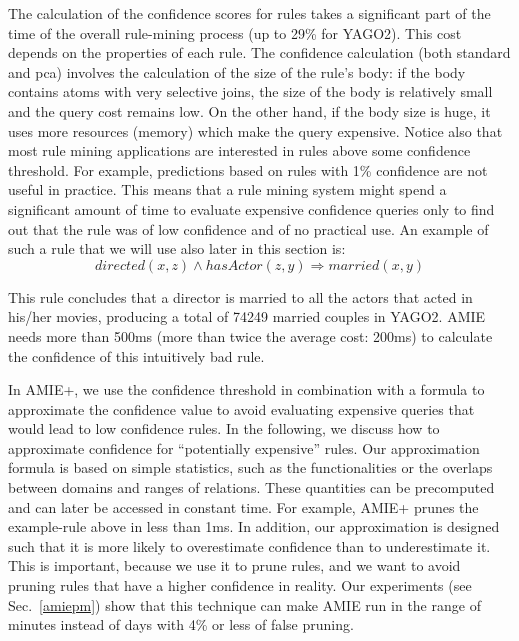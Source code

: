 The calculation of the confidence scores for rules takes a significant part of the time 
of the overall rule-mining process (up to 29\% for YAGO2). 
This cost depends on the properties of each rule. The confidence calculation (both standard and pca) involves the calculation of the 
size of the rule's body: if the body contains atoms with very selective joins, the size of the body is relatively small and the query cost remains low. 
On the other hand, if the body size is huge, it uses more resources (memory) which make the query expensive.
Notice also that most rule mining applications are interested in rules above some confidence threshold.
For example, predictions based on rules with 1\% confidence are not useful in practice.
This means that  a rule mining system might spend a significant amount of time to evaluate expensive confidence queries only to find out that
the rule was of low confidence and of no practical use.
An example of such a rule that we will use also later in this section is:
\[
  directed(x,z) \wedge hasActor(z,y) \Rightarrow married(x,y)
\]


This rule concludes that a director is married to all the actors that acted in his/her movies, producing a total of 74249 married couples in YAGO2.
AMIE needs more than 500ms (more than twice the average cost: 200ms) to calculate the confidence of this intuitively bad rule.

In AMIE+, we use the confidence threshold in combination with a formula to approximate the confidence value 
to avoid evaluating expensive queries that would lead to low confidence rules.
In the following, we discuss how to approximate confidence  for ``potentially expensive'' rules. 
Our approximation formula is based on simple statistics, such as the functionalities or the overlaps 
between domains and ranges of relations. 
These quantities
can be precomputed and can later be accessed in constant time. For example, AMIE+ prunes the example-rule above in less than 1ms.  
In addition, our approximation is designed such that it is more likely to overestimate confidence than to underestimate it.
This is important, because we use it to prune rules, and we want to avoid pruning rules that have a higher confidence in reality.
Our experiments (see Sec.~\ref{amiepm}) show that this technique can make AMIE run in the range of minutes instead of days with 4\% or less of false pruning.



